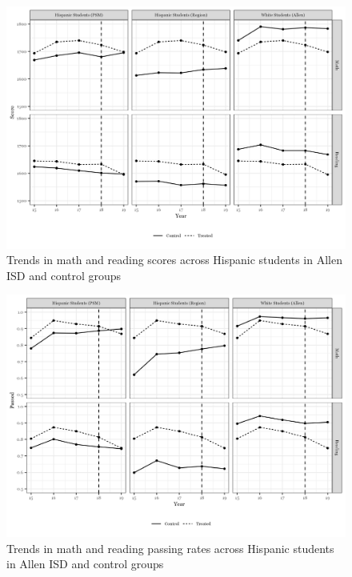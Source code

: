 \documentclass[hidelinks,twoside]{article}
\begin{document}
\clearpage
\vspace{1ex}
\begin{figure}[H]
\caption{{Trends in math and reading scores across Hispanic students in Allen ISD and control groups}}
\centerline{\includegraphics[scale=0.8]{did_trends_Score_math_reading.png}}
\end{figure}

\vspace{1ex}
\begin{figure}[H]
\caption{{Trends in math and reading passing rates across Hispanic students in Allen ISD and control groups}}
\centerline{\includegraphics[scale=0.8]{did_trends_Passed_math_reading.png}}
\end{figure}
\end{document}
